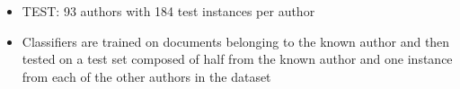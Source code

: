 \documentclass[paperwidth=47in,paperheight=71in,final, 16pt]{baposter}
\begin{document}
\begin{poster}
{\begin{itemize}
\item TEST: 93 authors with 184 test instances per author


\item Classifiers are trained on documents belonging to the known author and then tested on a test set composed of half from the known author and one instance from each of the other authors in the dataset


\end{itemize}



}




\end{poster}
\end{document}
